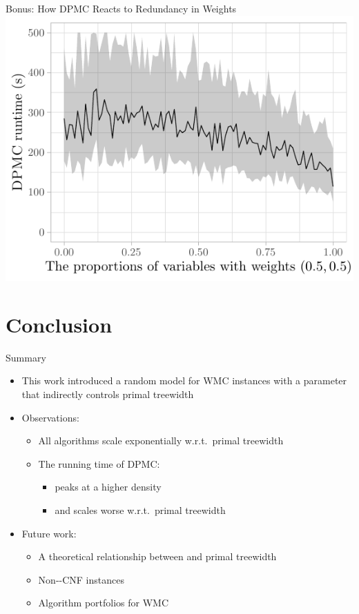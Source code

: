 \documentclass{beamer}
\begin{document}
\begin{frame}{Bonus: How \textsc{DPMC} Reacts to Redundancy in Weights}
  \centering
  \includegraphics{epsilon}
\end{frame}


\section{Conclusion}

\begin{frame}{Summary}
  \begin{itemize}
    \item This work introduced a \alert{random model} for WMC instances with a
          parameter that indirectly controls \alert{primal treewidth}
    \item Observations:
    \begin{itemize}
      \item All algorithms \alert{scale exponentially} w.r.t.\ primal treewidth
      \item The running time of \textsc{DPMC}:
      \begin{itemize}
        \item peaks at a higher density
        \item and scales worse w.r.t.\ primal treewidth
      \end{itemize}
    \end{itemize}
    \item Future work:
    \begin{itemize}
      \item A theoretical relationship between \structure{$\rho$} and primal treewidth
      \item Non--CNF instances
      \item Algorithm portfolios for WMC
    \end{itemize}
  \end{itemize}
\end{frame}
\end{document}
